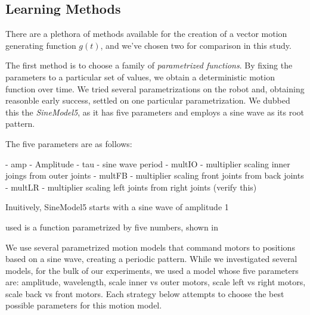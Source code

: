 \subsection{Learning Methods}

There are a plethora of methods available for the creation of a vector motion generating function $g(t)$, and we've chosen two for comparison in this study.

The first method is to choose a family of \emph{parametrized functions}.  By fixing the parameters to a particular set of values, we obtain a deterministic motion function over time.  We tried several parametrizations on the robot and, obtaining reasonble early success, settled on one particular parametrization.  We dubbed this the \emph{SineModel5}, as it has five parameters and employs a sine wave as its root pattern.

The five parameters are as follows:

 - amp - Amplitude
 - tau   - sine wave period
 - multIO - multiplier scaling inner joings from outer joints
 - multFB - multiplier scaling front joints from back joints
 - multLR - multiplier scaling left joints from right joints
(verify this)

Inuitively, SineModel5 starts with a sine wave of amplitude 1


 used is a function parametrized by five numbers, shown in 





We use several parametrized motion models that command motors to
positions based on a sine wave, creating a periodic pattern.  While we
investigated several models, for the bulk of our experiments, we used
a model whose five parameters are: amplitude, wavelength, scale inner
vs outer motors, scale left vs right motors, scale back vs front
motors. Each strategy below attempts to choose the best possible
parameters for this motion model.  

